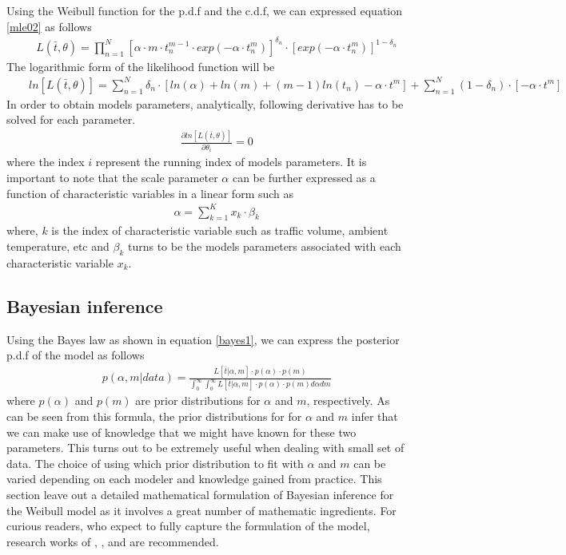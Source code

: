 Using the Weibull function for the p.d.f and the c.d.f, we can expressed equation \eqref{mle02} as follows
\begin{eqnarray}
 && L(\bar t,\theta) = \prod_{n=1}^N [\alpha\cdot m \cdot t_n^{m-1}\cdot exp(-\alpha\cdot t_n^m)]^{\delta_n}\cdot [exp(-\alpha\cdot t_n^m)]^{1-\delta_n} \label{mleweibull01}
\end{eqnarray}
The logarithmic form of the likelihood function will be
\begin{eqnarray}
 && ln[L(\bar t,\theta)] = \sum_{n=1}^N \delta_n \cdot \left[ ln(\alpha) + ln(m) + (m-1)ln(t_n)-\alpha\cdot t^m \right] + \sum_{n=1}^N (1-\delta_n)\cdot [-\alpha\cdot t^m]
   \label{mleweibull02}
\end{eqnarray}
In order to obtain models parameters, analytically, following derivative has to be solved for each parameter.
\begin{eqnarray}
 && \frac{\partial ln[L(\bar t,\theta)]}{\partial \theta_i} =0  \label{mleweibull03}
\end{eqnarray}
where the index $i$ represent the running index of models parameters. It is important to note that the scale parameter $\alpha$ can be further expressed as a function of characteristic variables in a linear form such as
\begin{eqnarray}
 && \alpha = \sum_{k=1}^K x_k\cdot \beta_k  \label{mleweibull04}
\end{eqnarray}
where, $k$ is the index of characteristic variable such as traffic volume, ambient temperature, etc and $\beta_k$ turns to be the models parameters associated with each characteristic variable $x_k$.
\subsection{Bayesian inference} \label{bayweil}
Using the Bayes law as shown in equation \eqref{bayes1}, we can express the posterior p.d.f of the model as follows
\begin{eqnarray}
 && p(\alpha,m|data)= \frac{L[\bar t|\alpha,m]\cdot p(\alpha)\cdot p(m)}{\int_0^{\infty}\int_0^{\infty}L[\bar t|\alpha,m]\cdot p(\alpha)\cdot p(m) d\alpha dm}   \label{mleweibull05}
\end{eqnarray}
where $p(\alpha)$ and $p(m)$ are prior distributions for $\alpha$ and $m$, respectively. As can be seen from this formula, the prior distributions for for $\alpha$ and $m$ infer that we can make use of knowledge that we might have known for these two parameters. This turns out to be extremely useful when dealing with small set of data. The choice of using which prior distribution to fit with $\alpha$ and $m$ can be varied depending on each modeler and knowledge gained from practice. This section leave out a detailed mathematical formulation of Bayesian inference for the Weibull model as it involves a great number of mathematic ingredients. For curious readers, who expect to fully capture the formulation of the model, research works of \cite{Dodson2006}, \cite{Nassar2005}, and \cite{Soliman2006} are recommended.
%
